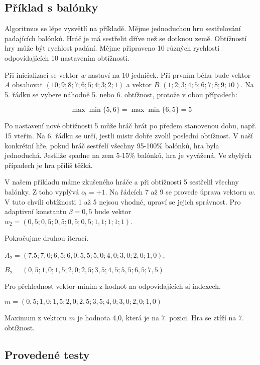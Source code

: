 \subsection{Příklad s balónky}

Algoritmus se lépe vysvětlí na příkladě\cite{23posm2}. Mějme jednoduchou hru sestřelování padajících balónků. Hráč je má sestřelit dříve než se dotknou země. Obtížností hry může být rychlost padání. Mějme připraveno 10 různých rychlostí odpovídajících 10 nastavením obtížnosti.

Při inicializaci se vektor $w$ nastaví na 10 jedniček. Při prvním běhu bude vektor $A$ obsahovat $(10; 9; 8; 7; 6; 5; 4; 3; 2; 1)$ a vektor $B$ $(1; 2; 3; 4; 5; 6; 7; 8; 9; 10)$. Na 5. řádku se vybere náhodně 5. nebo 6. obtížnost, protože v obou případech:


	\[
	\max{\min{\{5, 6\}}} = \max{\min{\{6, 5\}}} = 5
\]

Po nastavení nové obtížnosti 5 může hráč hrát po předem stanovenou dobu, např. 15 vteřin. Na 6. řádku se určí, jestli mistr dobře zvolil poslední obtížnost. V naší konkrétní hře, pokud hráč sestřelí všechny 95-100\% balónků, hra byla jednoduchá. Jestliže spadne na zem 5-15\% balónků, hra je vyvážená. Ve zbylých případech je hra příliš těžká.

V našem příkladu máme zkušeného hráče a při obtížnosti 5 sestřelil všechny balónky. Z toho vyplývá $o_t=+1$. Na řádcích 7 až 9 se provede úprava vektoru $w$. V tuto chvíli obtížnosti 1 až 5 nejsou vhodné, upraví se jejich správnost. Pro adaptivní konstantu $\beta=0,5$ bude vektor $w_2=(0,5;0,5;0,5;0,5;0,5;1,1;1;1;1)$.

Pokračujme druhou iterací. 

$A_2=(7.5;7,0;6,5;6,0;5,5;5,0;4,0;3,0;2,0;1,0)$, 

$B_2=(0,5;1,0;1,5;2,0;2,5;3,5;4,5;5,5;6,5;7,5)$

Pro přehlednost vektor minim z hodnot na odpovídajících si indexech.

$m=(0,5;1,0;1,5;2,0;2,5;3,5;4,0;3,0;2,0;1,0)$

Maximum z vektoru $m$ je hodnota 4,0, která je na 7. pozici. Hra se ztíží na 7. obtížnost.

\subsection{Provedené testy}

